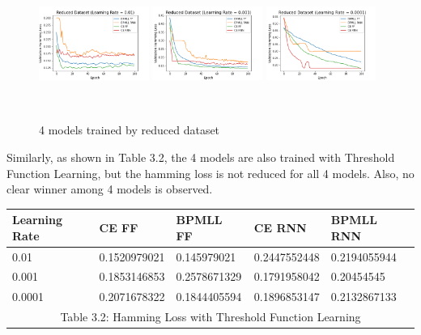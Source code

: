 \documentclass[11pt]{article}
\begin{document}
\begin{figure}[!htbp]
\centering 
        \includegraphics[width=0.32\textwidth,height=4.2cm]{Reduced_Dataset_Learning_Rate_01.png}
        \includegraphics[width=0.32\textwidth,height=4.2cm]{Reduced_Dataset_Learning_Rate_001.png}
        \includegraphics[width=0.32\textwidth,height=4.2cm]{Reduced_Dataset_Learning_Rate_0001.png}        
\caption[Original image and post processed image]{4 models trained by reduced dataset}
\label{fig:example2} 
\end{figure}

Similarly, as shown in Table 3.2, the 4 models are also trained with Threshold Function Learning, but the hamming loss is not reduced for all 4 models. Also, no clear winner among 4 models is observed. 

\vspace{0.45cm}
 \begin{tabular}[c]{| p{} | p{} |p{} |p{} |p{} |}
\hline
        \textbf{Learning Rate}  & \textbf{CE FF} & \textbf{BPMLL FF} & \textbf{CE RNN} & \textbf{BPMLL RNN}  \\
        \hline \hline
         0.01 & 0.1520979021 & 0.145979021 & 0.2447552448 & 0.2194055944\\
        \hline
         0.001 & 0.1853146853 & 0.2578671329 & 0.1791958042 & 0.20454545\\
        \hline
         0.0001 & 0.2071678322 & 0.1844405594 & 0.1896853147 & 0.2132867133\\
        \hline \hline      
        \multicolumn{5}{|c|}{Table 3.2: Hamming Loss with Threshold Function Learning} \\
        \hline
\end{tabular}
\end{document}
